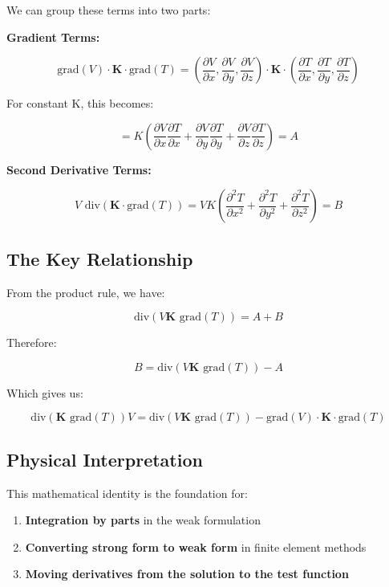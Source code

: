 \documentclass[
  11pt,
  a4paper,
]{scrbook}
\providecommand{\tightlist}{%
  \setlength{\itemsep}{0pt}\setlength{\parskip}{0pt}}\usepackage{longtable,booktabs,array}
\begin{document}
We can group these terms into two parts:

\textbf{Gradient Terms:}

\[
\text{grad}(V) \cdot \mathbf{K} \cdot \text{grad}(T) = \left(\frac{\partial V}{\partial x}, \frac{\partial V}{\partial y}, \frac{\partial V}{\partial z}\right) \cdot \mathbf{K} \cdot \left(\frac{\partial T}{\partial x}, \frac{\partial T}{\partial y}, \frac{\partial T}{\partial z}\right)
\]

For constant K, this becomes:

\[
= K\left(\frac{\partial V}{\partial x} \frac{\partial T}{\partial x} + \frac{\partial V}{\partial y} \frac{\partial T}{\partial y} + \frac{\partial V}{\partial z} \frac{\partial T}{\partial z}\right) = A
\]

\textbf{Second Derivative Terms:}

\[
V \text{ div}(\mathbf{K} \cdot \text{grad}(T)) = V K \left(\frac{\partial^2 T}{\partial x^2} + \frac{\partial^2 T}{\partial y^2} + \frac{\partial^2 T}{\partial z^2}\right) = B
\]

\subsection{The Key Relationship}\label{the-key-relationship}

From the product rule, we have:

\[
\text{div}(V \mathbf{K} \text{ grad}(T)) = A + B
\]

Therefore:

\[
B = \text{div}(V \mathbf{K} \text{ grad}(T)) - A
\]

Which gives us:

\[
\text{div}(\mathbf{K} \text{ grad}(T)) V = \text{div}(V \mathbf{K} \text{ grad}(T)) - \text{grad}(V) \cdot \mathbf{K} \cdot \text{grad}(T)
\]

\subsection{Physical Interpretation}\label{physical-interpretation}

This mathematical identity is the foundation for:

\begin{enumerate}
\def\labelenumi{\arabic{enumi}.}
\tightlist
\item
  \textbf{Integration by parts} in the weak formulation
\item
  \textbf{Converting strong form to weak form} in finite element methods
\item
  \textbf{Moving derivatives from the solution to the test function}
\end{enumerate}
\end{document}
